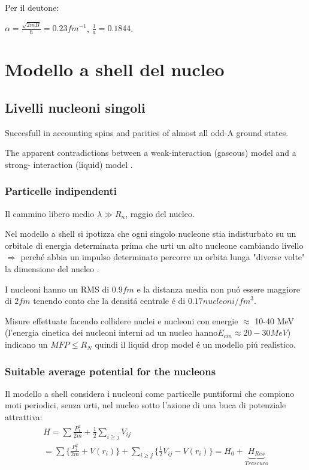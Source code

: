 \documentclass[main.tex]{subfiles}
\begin{document}
Per il deutone:

$\alpha=\frac{\sqrt{2mB}}{\hbar}=0.23 fm^{-1}$, $\frac{1}{a}=0.1844$.
 
\chapter{Modello a shell del nucleo}

\section{Livelli nucleoni singoli}
Succesfull in accounting spins and parities of almost all odd-A ground states.

 The apparent contradictions between a weak-interaction (gaseous) model and a strong- interaction (liquid) model .
 
\subsection{Particelle indipendenti}
Il cammino libero medio $\lambda \gg R_n$, raggio del nucleo. 

Nel modello a shell si ipotizza che ogni singolo nucleone stia indisturbato su un orbitale di energia determinata prima che urti un alto nucleone cambiando livello $\Rightarrow $ perch\'e abbia un impulso determinato percorre un orbita lunga "diverse volte" la dimensione del nucleo .

I nucleoni hanno un RMS di $0.9 fm$ e la distanza media non pu\'o essere maggiore di $2 fm$ tenendo conto che la densit\'a centrale \'e di $0.17 nucleoni/{fm}^3$.


Misure effettuate facendo collidere  nuclei e nucleoni con energie $\approx$ 10-40 MeV (l'energia cinetica dei nucleoni interni ad un nucleo hanno$E_{cin}\approx20-30 MeV$) indicano un $MFP \leq   R_N$ quindi il liquid drop model \'e un modello pi\'u realistico. 


\subsection{Suitable average potential for the nucleons}


Il modello a shell considera i nucleoni come particelle puntiformi che compiono moti periodici, senza urti, nel nucleo sotto l'azione di una buca di potenziale attrattiva:
\begin{align*}
H=\sum \frac{P_1^2}{2m} + \frac{1}{2}\sum_{i\geq j}V_{ij}\\
=\sum\{ \frac{P_i^2}{2m} + V(r_i)\}+ \sum_{i\geq j} \{ \frac{1}{2}V_{ij}-V(r_i) \}=H_0+\underbrace{H_{Res}}_{Trascuro}
\end{align*}
\end{document}

